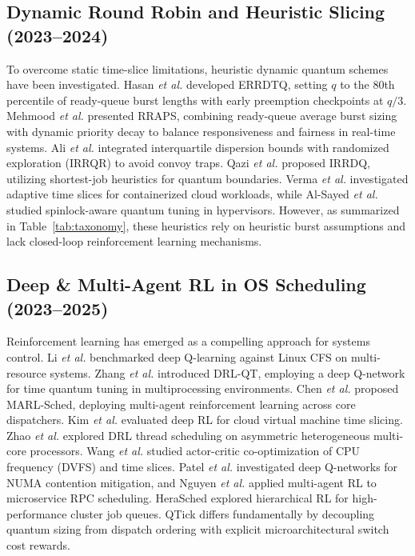 \documentclass[journal]{IEEEtran}
\begin{document}
\subsection{Dynamic Round Robin and Heuristic Slicing (2023--2024)}
To overcome static time-slice limitations, heuristic dynamic quantum schemes have been investigated. Hasan \textit{et al.} \cite{hasan2024enhanced} developed ERRDTQ, setting $q$ to the 80th percentile of ready-queue burst lengths with early preemption checkpoints at $q/3$. Mehmood \textit{et al.} \cite{mehmood2023optimizing} presented RRAPS, combining ready-queue average burst sizing with dynamic priority decay to balance responsiveness and fairness in real-time systems. Ali \textit{et al.} \cite{ali2023dynamic} integrated interquartile dispersion bounds with randomized exploration (IRRQR) to avoid convoy traps. Qazi \textit{et al.} \cite{qazi2023improving} proposed IRRDQ, utilizing shortest-job heuristics for quantum boundaries. Verma \textit{et al.} \cite{verma2023adaptive} investigated adaptive time slices for containerized cloud workloads, while Al-Sayed \textit{et al.} \cite{alsayed2023dynamic} studied spinlock-aware quantum tuning in hypervisors. However, as summarized in Table~\ref{tab:taxonomy}, these heuristics rely on heuristic burst assumptions and lack closed-loop reinforcement learning mechanisms.

\subsection{Deep \& Multi-Agent RL in OS Scheduling (2023--2025)}
Reinforcement learning has emerged as a compelling approach for systems control. Li \textit{et al.} \cite{li2024reinforcement} benchmarked deep Q-learning against Linux CFS on multi-resource systems. Zhang \textit{et al.} \cite{zhang2023deep} introduced DRL-QT, employing a deep Q-network for time quantum tuning in multiprocessing environments. Chen \textit{et al.} \cite{chen2023multi} proposed MARL-Sched, deploying multi-agent reinforcement learning across core dispatchers. Kim \textit{et al.} \cite{kim2024adaptive} evaluated deep RL for cloud virtual machine time slicing. Zhao \textit{et al.} \cite{zhao2024deep} explored DRL thread scheduling on asymmetric heterogeneous multi-core processors. Wang \textit{et al.} \cite{wang2024actor} studied actor-critic co-optimization of CPU frequency (DVFS) and time slices. Patel \textit{et al.} \cite{patel2023contention} investigated deep Q-networks for NUMA contention mitigation, and Nguyen \textit{et al.} \cite{nguyen2024decentralized} applied multi-agent RL to microservice RPC scheduling. HeraSched \cite{herasched2025optimizing} explored hierarchical RL for high-performance cluster job queues. QTick differs fundamentally by decoupling quantum sizing from dispatch ordering with explicit microarchitectural switch cost rewards.
\end{document}
